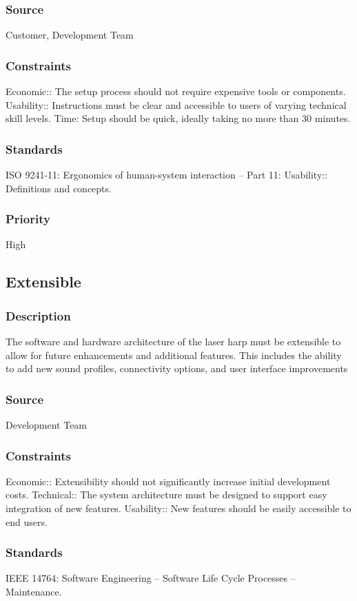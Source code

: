 \subsubsection{Source}
Customer, Development Team
\subsubsection{Constraints}
Economic:: The setup process should not require expensive tools or components.
Usability:: Instructions must be clear and accessible to users of varying technical skill levels.
Time: Setup should be quick, ideally taking no more than 30 minutes.
\subsubsection{Standards}
ISO 9241-11: Ergonomics of human-system interaction – Part 11: Usability:: Definitions and concepts.
\subsubsection{Priority}
High


\subsection{Extensible}
\subsubsection{Description}
The software and hardware architecture of the laser harp must be extensible to allow for future enhancements and additional features. This includes the ability to add new sound profiles, connectivity options, and user interface improvements
\subsubsection{Source}
Development Team
\subsubsection{Constraints}
Economic:: Extensibility should not significantly increase initial development costs.
Technical:: The system architecture must be designed to support easy integration of new features.
Usability:: New features should be easily accessible to end users.
\subsubsection{Standards}
IEEE 14764: Software Engineering – Software Life Cycle Processes – Maintenance.
